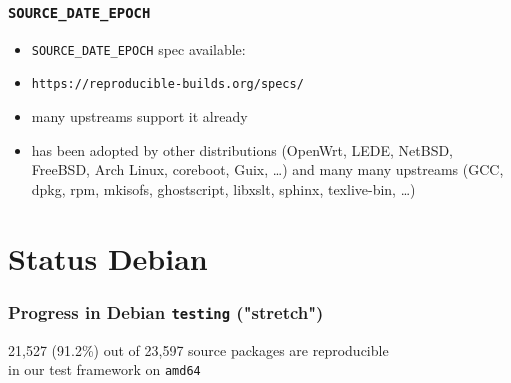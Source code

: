 \documentclass[14pt]{beamer}
\newif\ifplacelogo
\begin{document}
\begin{frame}
 \frametitle{\texttt{SOURCE\_DATE\_EPOCH}}

 \begin{itemize}
  \item \texttt{SOURCE\_DATE\_EPOCH} spec available:
  \item \texttt{https://reproducible-builds.org/specs/}
  \item many upstreams support it already
  \item has been adopted by other distributions
  (OpenWrt, LEDE, NetBSD, FreeBSD, Arch Linux, coreboot, Guix, …) and many many
  upstreams (GCC, dpkg, rpm, mkisofs, ghostscript, libxslt, sphinx,
  texlive-bin, …)
 \end{itemize}
\end{frame}


\placelogotrue

\section{Status Debian}

\begin{frame}
 \frametitle{Progress in Debian \texttt{testing} ("stretch")}
 \begin{center}
  \footnotesize{21,527 (91.2\%) out of 23,597 source packages are reproducible \\
    in our test framework on \texttt{amd64}}
  \vfill
 \end{center}
\end{frame}
\end{document}
